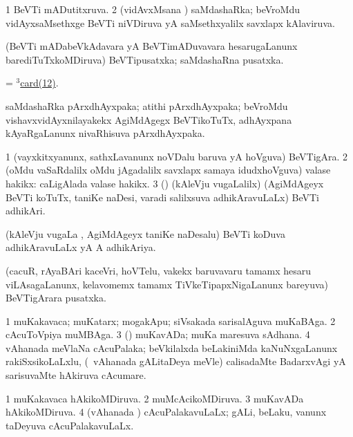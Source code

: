 \bentry
{} 
\gl{\gu}
\expl{}
\bmng
\bnum
\num{1} BeVTi mADutitxruva. 
\num{2} (vidAvxMsana \vi) saMdashaRka; beVroMdu vidAyxsaMsethxge BeVTi niVDiruva yA saMsethxyalilx savxlapx kAlaviruva. 
\enum
\emng
\eentry

\bentry
{} 
\gl{\nA}
\expl{}
\bmng
 (BeVTi mADabeVkAdavara yA BeVTimADuvavara hesarugaLanunx barediTuTxkoMDiruva) BeVTipusatxka; saMdashaRna pusatxka. 
\emng
\eentry

\bentry 
{} 
\gl{\nA}
\expl{}
\bmng
 = \hyperref{kandict_c.pdf}{C}{card(3)12}{$^3$card(12)}.
\emng
\eentry

\bentry 
{}
\gl{\nA}
\expl{}
\bmng
 saMdashaRka pArxdhAyxpaka; atithi pArxdhAyxpaka; beVroMdu vishavxvidAyxnilayakekx AgiMdAgegx BeVTikoTuTx, adhAyxpana kAyaRgaLanunx nivaRhisuva pArxdhAyxpaka. 
\emng
\eentry

\bentry 
{} 
\gl{\nA}
\expl{}
\bmng
\bnum
\num{1} (vayxkitxyanunx, sathxLavanunx noVDalu baruva yA hoVguva) BeVTigAra. 
\num{2} (oMdu vaSaRdalilx oMdu jAgadalilx savxlapx samaya idudxhoVguva) valase hakikx:  caLigAlada valase hakikx. 
\num{3} (\birx) (kAleVju \mo vugaLalilx) (AgiMdAgeyx BeVTi koTuTx, taniKe naDesi, varadi salilxsuva adhikAravuLaLx) BeVTi adhikAri. 
\enum
\emng
\eentry
 
\bentry
{} 
\gl{\gu}
\expl{}
\bmng
 (kAleVju \mo vugaLa \vi, AgiMdAgeyx taniKe naDesalu) BeVTi koDuva adhikAravuLaLx yA A adhikAriya. 
\emng
\eentry

\bentry
{}
\gl{\nA}
\expl{}
\bmng
 (cacuR, rAyaBAri kaceVri, hoVTelu, \mo vakekx baruvavaru tamamx hesaru viLAsagaLanunx, kelavomemx tamamx TiVkeTipapxNigaLanunx bareyuva) BeVTigArara pusatxka. 
\emng
\eentry

\bentry 
{} 
\gl{\nA}
\expl{}
\bmng
\bnum
\num{1} muKakavaca; muKatarx; mogakApu; siVsakada sarisalAguva muKaBAga. 
\num{2} cAcuToVpiya muMBAga. 
\num{3} (\ca) muKavADa; muKa maresuva sAdhana. 
\num{4} vAhanada meVlaNa cAcuPalaka; beVkilalxda beLakiniMda kaNuNxgaLanunx rakiSxsikoLaLxlu, (\kanmu\ vAhanada gALitaDeya meVle) calisadaMte BadarxvAgi yA sarisuvaMte hAkiruva cAcumare. 
\enum
\emng
\eentry

\bentry 
{} 
\gl{\gu}
\expl{}
\bmng
\bnum
\num{1} muKakavaca hAkikoMDiruva. 
\num{2} muMcAcikoMDiruva. 
\num{3} muKavADa hAkikoMDiruva. 
\num{4} (vAhanada \vi) cAcuPalakavuLaLx; gALi, beLaku, \mo vanunx taDeyuva cAcuPalakavuLaLx. 
\enum
\emng
\eentry


